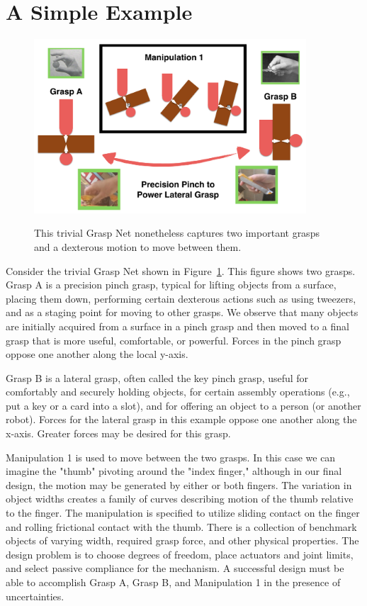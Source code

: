 \section{A Simple Example}


\begin{figure}
\begin{center}
{\includegraphics[width=4in]{./figs/simpleExample.png}}
\end{center}
\caption[]{This trivial Grasp Net nonetheless captures two important grasps and a dexterous motion to move between them.}
\label{SimpleGraspNet}
\end{figure}

Consider the trivial Grasp Net shown in Figure~\ref{SimpleGraspNet}.     This figure shows two grasps.   Grasp A is a precision pinch grasp, typical for lifting objects from a surface, placing them down, performing certain dexterous actions such as using tweezers, and as a staging point for moving to other grasps.   We observe that many objects are initially acquired from a surface in a pinch grasp and then moved to a final grasp that is more useful, comfortable, or powerful.    Forces in the pinch grasp oppose one another along the local y-axis.   

Grasp B is a lateral grasp, often called the key pinch grasp, useful for comfortably and securely holding objects, for certain assembly operations (e.g., put a key or a card into a slot), and for offering an object to a person (or another robot).   Forces for the lateral grasp in this example oppose one another along the x-axis.  Greater forces may be desired for this grasp.   

Manipulation 1 is used to move between the two grasps.   In this case we can imagine the "thumb" pivoting around the "index finger," although in our final design, the motion may be generated by either or both fingers.    The variation in object widths creates a family of curves describing motion of the thumb relative to the finger.   The manipulation is specified to utilize sliding contact on the finger and rolling frictional contact with the thumb.  There is a collection of benchmark objects of varying width, required grasp force, and other physical properties.   The design problem is to choose degrees of freedom, place actuators and joint limits, and select passive compliance for the mechanism.  A successful design must be able to accomplish Grasp A, Grasp B, and Manipulation 1 in the presence of uncertainties.

